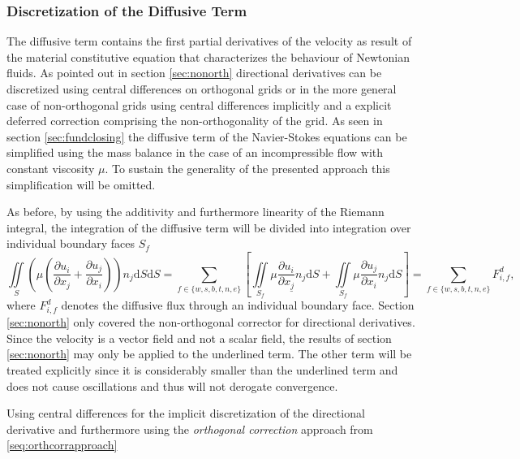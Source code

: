       \subsubsection{Discretization of the Diffusive Term}

      The diffusive term contains the first partial derivatives of the velocity as result of the material constitutive equation that characterizes the behaviour of Newtonian fluids. As pointed out in section \ref{sec:nonorth} directional derivatives can be discretized using central differences on orthogonal grids or in the more general case of non-orthogonal grids using central differences implicitly and a explicit deferred correction comprising the non-orthogonality of the grid. As seen in section \ref{sec:fundclosing} the diffusive term of the Navier-Stokes equations can be simplified using the mass balance in the case of an incompressible flow with constant viscosity \(\mu\). To sustain the generality of the presented approach this simplification will be omitted.

      As before, by using the additivity and furthermore linearity of the Riemann integral, the integration of the diffusive term will be divided into integration over individual boundary faces \(S_f\) 
      \begin{displaymath}
      \iint\limits_S \left(\mu \left( \frac{\partial u_i}{\partial x_j} + \frac{\partial u_j}{\partial x_i}\right)\right)n_j \mathrm{d}S \mathrm{d}S
      = \sum_{f \in \{w,s,b,t,n,e\}} \left[
        \iint\limits_{S_f} \mu \underline{\frac{\partial u_i}{\partial x_j}n_j} \mathrm{d}S
    + \iint\limits_{S_f} \mu \frac{\partial u_j}{\partial x_i}n_j \mathrm{d}S \right]
       = \sum_{f \in \{w,s,b,t,n,e\}} F_{i,f}^{d},
      \end{displaymath}
      where \(F_{i,f}^{d}\) denotes the diffusive flux through an individual boundary face. Section \ref{sec:nonorth} only covered the non-orthogonal corrector for directional derivatives. Since the velocity is a vector field and not a scalar field, the results of section \ref{sec:nonorth} may only be applied to the underlined term. The other term will be treated explicitly since it is considerably smaller than the underlined term and does not cause oscillations and thus will not derogate convergence.

      Using central differences for the implicit discretization of the directional derivative and furthermore using the \textit{orthogonal correction} approach from \ref{seq:orthcorrapproach}


